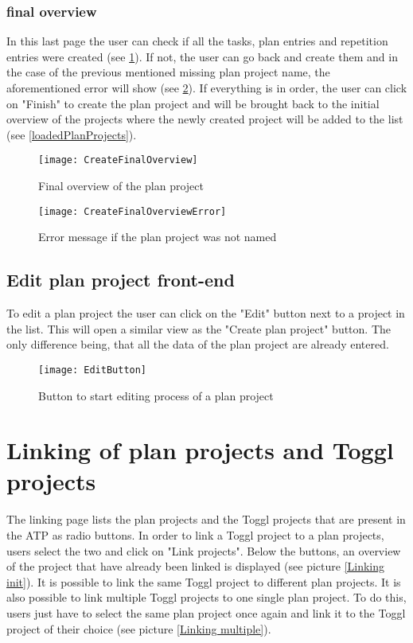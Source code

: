 \subsubsection{final overview}
In this last page the user can check if all the tasks, plan entries and repetition entries were created (see \ref{createFinalOverview}). If not, the user can go back and create them and in the case of the previous mentioned missing plan project name, the aforementioned error will show (see \ref{createFinalOverviewError}). If everything is in order, the user can click on "Finish" to create the plan project and will be brought back to the initial overview of the projects where the newly created project will be added to the list (see \ref{loadedPlanProjects}).
\begin{figure}[H]
	\centering
	\texttt{[image: CreateFinalOverview]}
	\caption{Final overview of the plan project}
	\label{createFinalOverview}
\end{figure}
\begin{figure}[H]
	\centering
	\texttt{[image: CreateFinalOverviewError]}
	\caption{Error message if the plan project was not named}
	\label{createFinalOverviewError}
\end{figure}

\subsection{Edit plan project front-end}
To edit a plan project the user can click on the "Edit" button next to a project in the list. This will open a similar view as the "Create plan project" button. The only difference being, that all the data of the plan project are already entered.
\begin{figure}[H]
	\centering
	\texttt{[image: EditButton]}
	\caption{Button to start editing process of a plan project}
	\label{editButton}
\end{figure}

\section{Linking of plan projects and Toggl projects} \label{Linking}
The linking page lists the plan projects and the Toggl projects that are present in the ATP as radio buttons. In order to link a Toggl project to a plan projects, users select the two and click on "Link projects". Below the buttons, an overview of the project that have already been linked is displayed (see picture \ref{Linking init}). It is possible to link the same Toggl project to different plan projects. It is also possible to link multiple Toggl projects to one single plan project. To do this, users just have to select the same plan project once again and link it to the Toggl project of their choice (see picture \ref{Linking multiple}).

